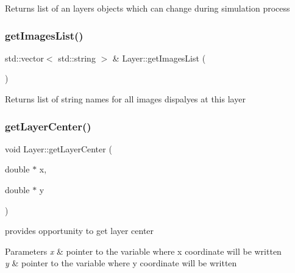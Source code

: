 \begin{DoxyReturn}{Returns}
list of an layers objects which can change during simulation process 
\end{DoxyReturn}
\mbox{\label{class_layer_a9acbfda611b85762f4a39ece4ea4df33}} 
\subsubsection{\texorpdfstring{get\+Images\+List()}{getImagesList()}}
{\footnotesize\ttfamily std\+::vector$<$ std\+::string $>$ \& Layer\+::get\+Images\+List (\begin{DoxyParamCaption}{ }\end{DoxyParamCaption})\hspace{0.3cm}{\ttfamily [virtual]}}

\begin{DoxyReturn}{Returns}
list of string names for all images dispalyes at this layer 
\end{DoxyReturn}
\mbox{\label{class_layer_af2778374314bfe517007c0b0ac3fc896}} 
\subsubsection{\texorpdfstring{get\+Layer\+Center()}{getLayerCenter()}}
{\footnotesize\ttfamily void Layer\+::get\+Layer\+Center (\begin{DoxyParamCaption}\item[{double $\ast$}]{x,  }\item[{double $\ast$}]{y }\end{DoxyParamCaption})\hspace{0.3cm}{\ttfamily [virtual]}}



provides opportunity to get layer center 


\begin{DoxyParams}{Parameters}
{\em x} & pointer to the variable where x coordinate will be written \\
\hline
{\em y} & pointer to the variable where y coordinate will be written \\
\hline
\end{DoxyParams}


